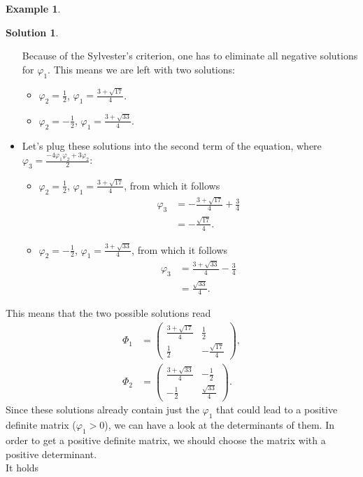 \documentclass[a4paper,12 pt]{article}
\numberwithin{equation}{section}
\theoremstyle{definition}
\newtheorem{bsp}{Example}
\theoremstyle{remark}
\theoremstyle{definition}
\newtheorem*{lsg}{Solution}
\theoremstyle{definition}
\theoremstyle{definition}
\theoremstyle{remark}
\begin{document}
\begin{bsp}
\begin{lsg}
\begin{itemize}
Because of the Sylvester's criterion, one has to eliminate all negative solutions for $\varphi_1$. This means we are left with two solutions:
\begin{itemize}
\item $\varphi_2=\frac{1}{2}$, $\varphi_1=\frac{3+\sqrt{17}}{4}$.
\item $\varphi_2=-\frac{1}{2}$, $\varphi_1=\frac{3+\sqrt{33}}{4}$.
\end{itemize}
\item Let's plug these solutions into the second term of the equation, where $\varphi_3=\frac{-4\varphi_1 \varphi_2 +3 \varphi_2}{2}$:
\begin{itemize}
\item $\varphi_2=\frac{1}{2}$, $\varphi_1=\frac{3+\sqrt{17}}{4}$, from which it follows 
\begin{equation*}
\begin{split}
\varphi_3&=-\frac{3+\sqrt{17}}{4}+\frac{3}{4}\\
&=-\frac{\sqrt{17}}{4}.
\end{split}
\end{equation*}
\item $\varphi_2=-\frac{1}{2}$, $\varphi_1=\frac{3+\sqrt{33}}{4}$, from which it follows 
\begin{equation*}
\begin{split}
\varphi_3&=\frac{3+\sqrt{33}}{4}-\frac{3}{4}\\
&=\frac{\sqrt{33}}{4}.
\end{split}
\end{equation*}
\end{itemize}
\end{itemize}
This means that the two possible solutions read
\begin{equation*}
\begin{split}
\Phi_1&=\begin{pmatrix}
\frac{3+\sqrt{17}}{4}&\frac{1}{2} \\[6pt]
\frac{1}{2}&-\frac{\sqrt{17}}{4} 
\end{pmatrix},\\
\Phi_2&=\begin{pmatrix}
\frac{3+\sqrt{33}}{4}&-\frac{1}{2} \\[6pt]
-\frac{1}{2}&\frac{\sqrt{33}}{4}
\end{pmatrix}.
\end{split}
\end{equation*}
Since these solutions already contain just the $\varphi_1$ that could lead to a positive definite matrix ($\varphi_1>0$), we can have a look at the determinants of them. In order to get a positive definite matrix, we should choose the matrix with a positive determinant. \\ It holds

\end{lsg}
\end{bsp}
\end{document}
